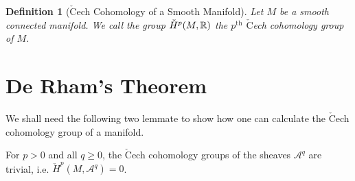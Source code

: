 \documentclass[11pt]{preprint}
\newtheorem{defn}[lemma]{Definition}
\def\cA{\mathscr{A}}
\def\Cech{\check{H}}
\numberwithin{equation}{section}
\begin{document}
\begin{defn}[$\check{\mathrm{C}}$ech Cohomology of a Smooth Manifold]
  Let $M$ be a smooth connected manifold. We call the group $\check H^p(M,{\mathbb R})$ the $p^{\text{th}}$ $\check{\mathrm{C}}$ech cohomology group of $M$.
\end{defn}



\section{De Rham's Theorem} 

We shall need the following two lemmate to show how one can calculate the $\check{\mathrm{C}}$ech cohomology group of a manifold.

\begin{lemma}
    For $p > 0$ and all $q\geqslant 0$, the $\check{\mathrm{C}}$ech cohomology groups of the sheaves $\cA^q$ are trivial, i.e. $\Cech^p(M,\cA^q) = 0$. 
\end{lemma}
\end{document}
